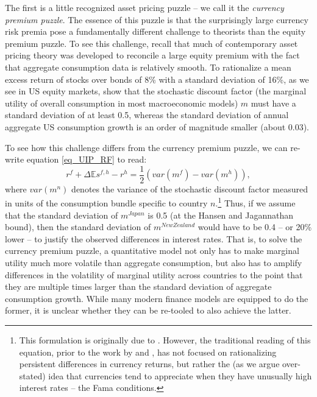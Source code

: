 \documentclass{ar-1col}
\begin{document}
The first is a little recognized asset pricing puzzle -- we call it the \textit{currency premium puzzle}. The essence of this puzzle is that the surprisingly large currency risk premia pose a fundamentally different challenge to theorists than the equity premium puzzle. To see this challenge, recall that much of contemporary asset pricing theory was developed to reconcile a large equity premium with the fact that aggregate consumption data is relatively smooth. To rationalize a mean excess return of stocks over bonds of 8\% with a standard deviation of 16\%, as we see in US equity markets, \citet{HansenJagannathan1991} show that the stochastic discount factor (the marginal utility of overall consumption in most macroeconomic models) $m$ must have a standard deviation of at least 0.5, whereas the standard deviation of annual aggregate US consumption growth is an order of magnitude smaller (about 0.03).  

To see how this challenge differs from the currency premium puzzle, we can re-write equation \ref{eq_UIP_RF} to read: 
\begin{equation}
  r^{f} + \Delta \mathbb{E} s^{f,h} - r^{h} 
  =\frac{1}{2}\left(var(m^f)-var(m^h)\right),
\end{equation} 
where $var(m^n)$ denotes the variance of the stochastic discount factor measured in units of the consumption bundle specific to country $n$.\footnote{This formulation is originally due to \cite{Backusetal2001}. However, the traditional reading of this equation, prior to the work by \cite{LustigRoussanovVerdelhan2011} and \cite{HassanMano2019}, has not focused on rationalizing persistent differences in currency returns, but rather the (as we argue over-stated) idea that currencies tend to appreciate when they have unusually high interest rates -- the Fama conditions.} Thus, if we assume that the standard deviation of $m^{Japan}$ is 0.5 (at the Hansen and Jagannathan bound), then the standard deviation of $m^{New Zealand}$ would have to be 0.4 -- or 20\% lower -- to justify the observed differences in interest rates. That is, to solve the currency premium puzzle, a quantitative model not only has to make marginal utility much more volatile than aggregate consumption, but also has to amplify differences in the volatility of marginal utility across countries to the point that they are multiple times larger than the standard deviation of aggregate consumption growth. While many modern finance models are equipped to do the former, it is unclear whether they can be re-tooled to also achieve the latter. 
\end{document}
